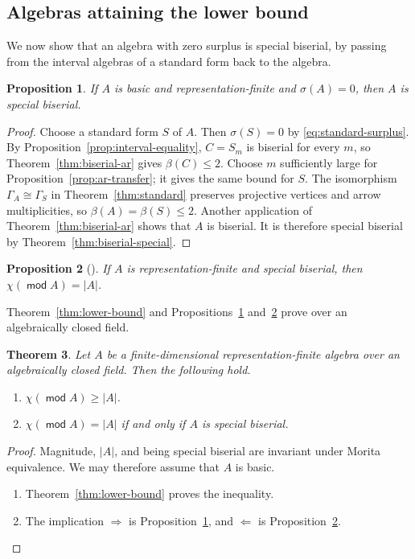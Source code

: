 \documentclass[a4paper,reqno,10pt]{amsart}
\newtheorem{theorem}{Theorem}[section]
\newtheorem{proposition}[theorem]{Proposition}
\theoremstyle{definition}
\numberwithin{equation}{section}
\DeclareMathOperator{\moduleCategory}{\mathsf{mod}}
\renewcommand{\mod}{\moduleCategory}
\begin{document}
\subsection{Algebras attaining the lower bound}
We now show that an algebra with zero surplus is special biserial, by passing from
the interval algebras of a standard form back to the algebra.

\begin{proposition}\label{prop:equality-forward}
If \(A\) is basic and representation-finite and \(\sigma(A)=0\), then
\(A\) is special biserial.
\end{proposition}
\begin{proof}
Choose a standard form \(S\) of \(A\). Then \(\sigma(S)=0\) by
\eqref{eq:standard-surplus}. By Proposition~\ref{prop:interval-equality},
\(C=S_m\) is biserial for every \(m\), so Theorem~\ref{thm:biserial-ar} gives
\(\beta(C)\leq2\). Choose \(m\) sufficiently large for Proposition~\ref{prop:ar-transfer}; it gives the same
bound for \(S\). The isomorphism \(\Gamma_A\cong\Gamma_S\) in
Theorem~\ref{thm:standard} preserves projective vertices and arrow
multiplicities, so \(\beta(A)=\beta(S)\leq2\). Another application
of Theorem~\ref{thm:biserial-ar} shows that \(A\) is biserial.
It is therefore special biserial by Theorem~\ref{thm:biserial-special}.
\end{proof}

\begin{proposition}[{\cite[Theorem~3.5]{BHK}}]\label{prop:equality-converse}
If \(A\) is representation-finite and special biserial, then
\(\chi(\mod A)=|A|\).
\end{proposition}

Theorem~\ref{thm:lower-bound} and
Propositions~\ref{prop:equality-forward} and~\ref{prop:equality-converse}
prove \cite[Conjecture~A]{BHK} over an algebraically closed field.
\begin{theorem}\label{thm:main}
Let \(A\) be a finite-dimensional representation-finite algebra over an
algebraically closed field. Then the following hold.
\begin{enumerate}
\item \(\chi(\mod A)\geq |A|\).
\item \(\chi(\mod A)=|A|\) if and only if \(A\) is special biserial.
\end{enumerate}
\end{theorem}
\begin{proof}
Magnitude, \(|A|\), and being special biserial are invariant under
Morita equivalence. We may therefore assume that \(A\)
is basic.
\begin{enumerate}
\item Theorem~\ref{thm:lower-bound} proves the inequality.
\item The implication \(\Rightarrow\) is
Proposition~\ref{prop:equality-forward}, and \(\Leftarrow\) is
Proposition~\ref{prop:equality-converse}.
\end{enumerate}
\end{proof}
\end{document}
